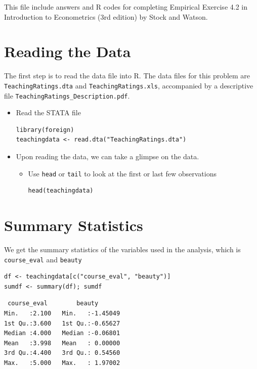 \documentclass[a4paper,11pt]{article}
\author{Zheng Tian}
\date{\today}
\title{}
\begin{document}
\tableofcontents

This file include answers and R codes for completing Empirical
Exercise 4.2 in Introduction to Econometrics (3rd edition) by Stock
and Watson.

\section{Reading the Data}
\label{sec:org27fea18}

The first step is to read the data file into R. The data files for
this problem are \texttt{TeachingRatings.dta} and \texttt{TeachingRatings.xls},
accompanied by a descriptive file \texttt{TeachingRatings\_Description.pdf}.

\begin{itemize}
\item Read the STATA file

\begin{verbatim}
library(foreign)
teachingdata <- read.dta("TeachingRatings.dta")
\end{verbatim}

\item Upon reading the data, we can take a glimpse on the data.

\begin{itemize}
\item Use \texttt{head} or \texttt{tail} to look at the first or last few observations

\begin{verbatim}
head(teachingdata)
\end{verbatim}
\end{itemize}
\end{itemize}


\section{Summary Statistics}
\label{sec:org73693f3}

We get the summary statistics of the variables used in the analysis,
which is \texttt{course\_eval} and \texttt{beauty}

\begin{verbatim}
df <- teachingdata[c("course_eval", "beauty")]
sumdf <- summary(df); sumdf
\end{verbatim}

\begin{verbatim}
 course_eval        beauty
Min.   :2.100   Min.   :-1.45049
1st Qu.:3.600   1st Qu.:-0.65627
Median :4.000   Median :-0.06801
Mean   :3.998   Mean   : 0.00000
3rd Qu.:4.400   3rd Qu.: 0.54560
Max.   :5.000   Max.   : 1.97002
\end{verbatim}
\end{document}
